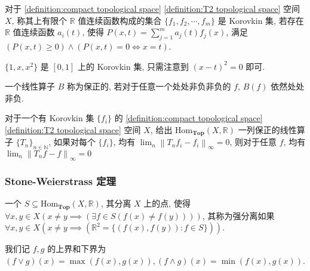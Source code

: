 \begin{definition}[Korovkin 集]
    对于 \ref{definition:compact topological space} \ref{definition:T2 topological space} 空间 \(X\), 称其上有限个 \(\mathbb{R}\) 值连续函数构成的集合 \(\{f_1,f_2,\cdots,f_m\}\) 是 Korovkin 集,
    若存在 \(\mathbb{R}\) 值连续函数 \(a_i (t)\), 使得 \(P(x,t) = \sum_{j=1}^{m} a_j(t) f_j(x)\), 满足 \((P(x,t) \geq 0) \land (P(x,t) = 0 \iff x = t)\).
\end{definition}

\begin{example}
    \(\{1,x,x^2\}\) 是 \([0,1]\) 上的 Korovkin 集, 只需注意到 \((x-t)^2 = 0\) 即可.
\end{example}

\begin{definition}[保正]
    \label {definition:positivity-preserving operator}
    一个线性算子 \(B\) 称为保正的, 若对于任意一个处处非负非负的 \(f\), \(B(f)\) 依然处处非负.
\end{definition}

\begin{theorem}[Korovkin]
    \label {theorem:Korovkin's theorem}
    对于一个有 Korovkin 集 \(\{f_i\}\) 的 \ref{definition:compact topological space} \ref{definition:T2 topological space} 空间 \(X\), 
    给出 \(\mathrm{Hom}_{\mathbf{Top}} (X,\mathbb{R})\) 一列保正的线性算子 \(\{T_n\}_{n \in \mathbb{N}}\), 如果对每个 \(\{f_i\}\),
    均有 \(\lim_n \left\| T_n f_i - f_i \right\|_\infty = 0\), 则对于任意 \(f\), 均有 \(\lim_n \left\| T_n f - f \right\|_\infty = 0\)
\end{theorem}

\subsubsection{Stone-Weierstrass 定理}

\begin{definition}[分离点]
    一个 \(S \subseteq \mathrm{Hom}_{\mathbf{Top}} (X,\mathbb{R})\), 其分离 \(X\) 上的点,
    使得 \(\forall x,y \in X (x \neq y \implies (\exists f \in S (f(x) \neq f(y))))\), 
    其称为强分离如果 \(\forall x,y \in X (x \neq y \implies (\mathbb{R}^2 = \{(f(x),f(y)) : f \in S\}))\).
\end{definition}

\begin{remark}
    我们记 \(f,g\) 的上界和下界为 \((f \vee g) (x) = \max (f(x),g(x)),(f \wedge g) (x) = \min (f(x),g(x))\).
\end{remark}

